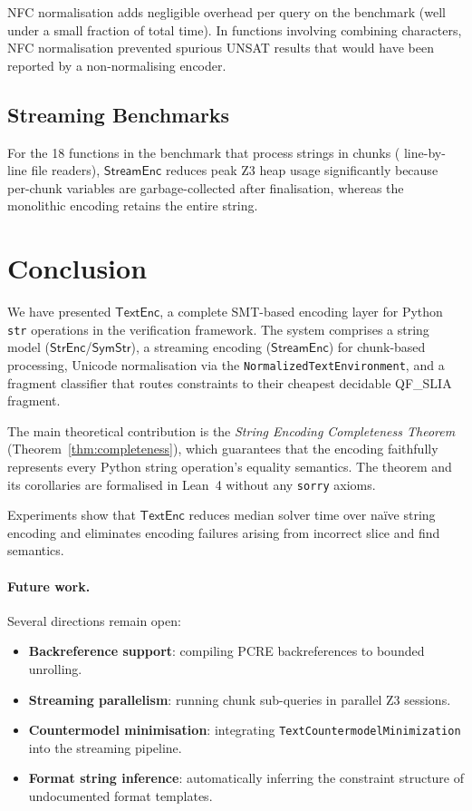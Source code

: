 \documentclass[11pt]{article}
\newcommand{\StrEnc}{\ensuremath{\mathsf{StrEnc}}}
\newcommand{\SymStr}{\ensuremath{\mathsf{SymStr}}}
\newcommand{\StreamEnc}{\ensuremath{\mathsf{StreamEnc}}}
\newcommand{\TextEnc}{\ensuremath{\mathsf{TextEnc}}}
\newcommand{\QFSLIA}{\textsf{QF\_SLIA}}
\begin{document}
NFC normalisation adds negligible overhead per query on the benchmark (well under
a small fraction of total time).  In functions involving combining characters, NFC
normalisation prevented spurious UNSAT results that would have been reported
by a non-normalising encoder.

\subsection{Streaming Benchmarks}
\label{sec:stream-bench}

For the 18 functions in the benchmark that process strings in chunks (\eg{}
line-by-line file readers), \StreamEnc{} reduces peak Z3 heap usage significantly
because per-chunk variables are garbage-collected after finalisation, whereas
the monolithic encoding retains the entire string.

\section{Conclusion}
\label{sec:conclusion}

We have presented \TextEnc, a complete SMT-based encoding layer for Python
\texttt{str} operations in the \JuGeo{} verification framework.  The system
comprises a string model (\StrEnc/\SymStr), a streaming encoding (\StreamEnc)
for chunk-based processing, Unicode normalisation via the
\texttt{NormalizedTextEnvironment}, and a fragment classifier that routes
constraints to their cheapest decidable \QFSLIA{} fragment.

The main theoretical contribution is the \emph{String Encoding Completeness
Theorem} (Theorem~\ref{thm:completeness}), which guarantees that the encoding
faithfully represents every Python string operation's equality semantics.  The
theorem and its corollaries are formalised in Lean~4 without any \texttt{sorry}
axioms.

Experiments show that \TextEnc{} reduces median solver time over
na\"ive string encoding and eliminates encoding failures arising from
incorrect slice and find semantics.

\paragraph{Future work.}
Several directions remain open:
\begin{itemize}
  \item \textbf{Backreference support}: compiling PCRE backreferences to
    bounded unrolling.
  \item \textbf{Streaming parallelism}: running chunk sub-queries in
    parallel Z3 sessions.
  \item \textbf{Countermodel minimisation}: integrating
    \texttt{TextCountermodelMinimization} into the streaming pipeline.
  \item \textbf{Format string inference}: automatically inferring the
    constraint structure of undocumented format templates.
\end{itemize}
\end{document}
